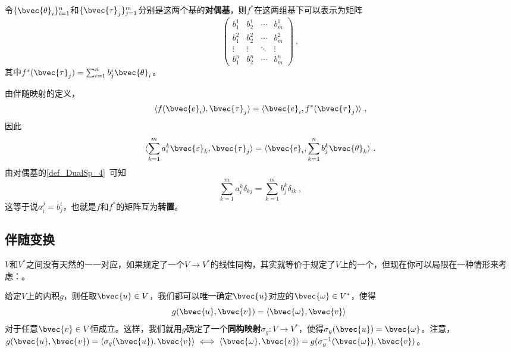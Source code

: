 令$\{\bvec{\theta}_i\}_{i=1}^n$和$\{\bvec{\tau}_j\}_{j=1}^m$分别是这两个基的\textbf{对偶基}，则$f^*$在这两组基下可以表示为矩阵
\begin{equation}
\begin{pmatrix}
b^1_1&b^1_2&\cdots&b^1_m\\
b^2_1&b^2_2&\cdots&b^2_m\\
\vdots&\vdots&\ddots&\vdots\\
b^n_1&b^n_2&\cdots&b^n_m
\end{pmatrix}~, 
\end{equation}
其中$f^*(\bvec{\tau}_j)=\sum_{i=1}^n b^i_j\bvec{\theta}_i$。

由伴随映射的定义，
\begin{equation}
\langle f(\bvec{e}_i), \bvec{\tau}_j \rangle =\langle \bvec{e}_i, f^*(\bvec{\tau}_j) \rangle ~, 
\end{equation}
因此
\begin{equation}
\langle \sum_{k=1}^m a^k_i\bvec{\varepsilon}_k, \bvec{\tau}_j \rangle =\langle \bvec{e}_i, \sum_{k=1}^n b^k_j\bvec{\theta}_k \rangle ~. 
\end{equation}
由对偶基的\autoref{def_DualSp_4}~可知
\begin{equation}
\sum_{k=1}^m a^k_i\delta_{kj} = \sum_{k=1}^m b^k_j\delta_{ik}~, 
\end{equation}
这等于说$a^j_i=b^i_j$，也就是$f$和$f^*$的矩阵互为\textbf{转置}。






\subsection{伴随变换}



$V$和$V^*$之间没有天然的一一对应，如果规定了一个$V\to V^*$的线性同构，其实就等价于规定了$V$上的一个，但现在你可以局限在一种情形来考虑：。

给定$V$上的内积$g$，则任取$\bvec{u}\in V$，我们都可以唯一确定$\bvec{u}$对应的$\bvec{\omega}\in V^*$，使得
\begin{equation}\label{eq_AdjMap_2}
g(\bvec{u}, \bvec{v}) = \langle \bvec{\omega}, \bvec{v} \rangle~
\end{equation}
对于任意$\bvec{v}\in V$恒成立。这样，我们就用$g$确定了一个\textbf{同构映射}$\sigma_g:V\to V^*$，使得$\sigma_g(\bvec{u})=\bvec{\omega}$。注意，$g(\bvec{u}, \bvec{v}) = \langle \sigma_g(\bvec{u}) , \bvec{v} \rangle \iff \langle \bvec{\omega}, \bvec{v} \rangle = g(\sigma_g^{-1}(\bvec{\omega}), \bvec{v})$。




